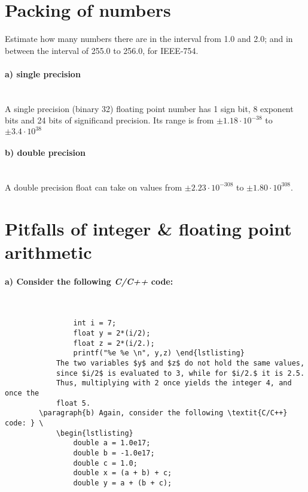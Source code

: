 \documentclass[11 pt]{article}
\begin{document}
    \section{Packing of numbers}
        Estimate how many numbers there are in the interval from 1.0 
        and 2.0; and in between the interval of 255.0 to 256.0, for 
        IEEE-754.

        \paragraph{a) single precision} \ \\
        A single precision (binary 32) floating point number has 1 sign bit,
        8 exponent bits and 24 bits of significand precision. Its range is 
        from $\pm1.18\cdot10^{-38}$ to $\pm3.4\cdot10^{38}$

        \paragraph{b) double precision} \ \\
        A double precision float can take on values from 
        $\pm2.23\cdot10^{-308}$ to $\pm1.80\cdot10^{308}$.
        

    \section{Pitfalls of integer \& floating point arithmetic}
        \paragraph{a)  Consider the following \textit{C/C++} code: } \ 
            \begin{lstlisting}
                int i = 7;
                float y = 2*(i/2);
                float z = 2*(i/2.);
                printf("%e %e \n", y,z) \end{lstlisting}
            The two variables $y$ and $z$ do not hold the same values, 
            since $i/2$ is evaluated to 3, while for $i/2.$ it is 2.5.
            Thus, multiplying with 2 once yields the integer 4, and once the 
            float 5.
        \paragraph{b) Again, consider the following \textit{C/C++} code: } \
            \begin{lstlisting}
                double a = 1.0e17;
                double b = -1.0e17;
                double c = 1.0;
                double x = (a + b) + c;
                double y = a + (b + c); \end{lstlisting}
\end{document}
